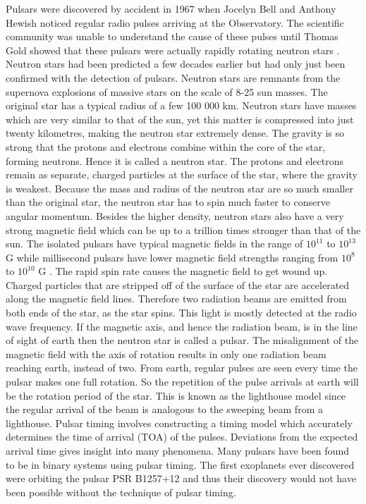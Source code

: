 \documentclass[12pt]{article}
\begin{document}
	Pulsars were discovered by accident in 1967 when Jocelyn Bell and Anthony Hewish noticed regular radio pulses arriving at the Observatory. The scientific community was unable to understand the cause of these pulses until Thomas Gold showed that these pulsars were actually rapidly rotating neutron stars \cite{gold1968rotating}. Neutron stars had been predicted a few decades earlier but had only just been confirmed with the detection of pulsars. Neutron stars are remnants from the supernova explosions of massive stars on the scale of 8-25 sun masses. The original star has a typical radius of a few 100 000 km. Neutron stars have masses which are very similar to that of the sun, yet this matter is compressed into just twenty kilometres, making the neutron star extremely dense. The gravity is so strong that the protons and electrons combine within the core of the star, forming neutrons. Hence it is called a neutron star. The protons and electrons remain as separate, charged particles at the surface of the star, where the gravity is weakest. Because the mass and radius of the neutron star are so much smaller than the original star, the neutron star has to spin much faster to conserve angular momentum. Besides the higher density, neutron stars also have a very strong magnetic field which can be up to a trillion times stronger than that of the sun. The isolated pulsars have typical magnetic fields in the range of $10^{11}$ to $10^{13}$ G while millisecond pulsars have lower magnetic field strengths ranging from $10^{8}$ to $10^{10
	}$ G \cite{bisnovatyi2006binary}. The rapid spin rate causes the magnetic field to get wound up. Charged particles that are stripped off of the surface of the star are accelerated along the magnetic field lines. Therefore two radiation beams are emitted from both ends of the star, as the star spins. This light is mostly detected at the radio wave frequency. If the magnetic axis, and hence the radiation beam, is in the line of sight of earth then the neutron star is called a pulsar. The misalignment of the magnetic field with the axis of rotation results in only one radiation beam reaching earth, instead of two. From earth, regular pulses are seen every time the pulsar makes one full rotation. So the repetition of the pulse arrivals at earth will be the rotation period of the star. This is known as the lighthouse model since the regular arrival of the beam is analogous to the sweeping beam from a lighthouse. Pulsar timing involves constructing a timing model which accurately determines the time of arrival (TOA) of the pulses. Deviations from the expected arrival time gives insight into many phenomena.  Many pulsars have been found to be in binary systems using pulsar timing. The first exoplanets ever discovered were orbiting the pulsar PSR B1257+12 and thus their discovery would not have been possible without the technique of pulsar timing. 
	
\end{document}
